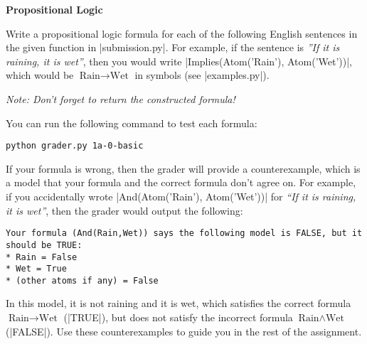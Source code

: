 \item {\bf Propositional Logic}

Write a propositional logic formula for each of the following English sentences
in the given function in |submission.py|. For example, if the sentence is
{\em ''If it is raining, it is wet''}, then you would write
|Implies(Atom('Rain'), Atom('Wet'))|, which would be $\text{Rain} \to
\text{Wet}$ in symbols (see |examples.py|).

{\em Note: Don't forget to return the constructed formula!}

\begin{enumerate}

  

  

  

\end{enumerate}

You can run the following command to test each formula:
\begin{lstlisting}
python grader.py 1a-0-basic
\end{lstlisting}

If your formula is wrong, then the grader will provide a counterexample, which
is a model that your formula and the correct formula don't agree on. For
example, if you accidentally wrote |And(Atom('Rain'), Atom('Wet'))| for
{\em ``If it is raining, it is wet''}, then the grader would output the
following:
\begin{lstlisting}
Your formula (And(Rain,Wet)) says the following model is FALSE, but it should be TRUE:
* Rain = False
* Wet = True
* (other atoms if any) = False
\end{lstlisting}

In this model, it is not raining and it is wet, which satisfies the correct
formula $\text{Rain} \to \text{Wet}$ (|TRUE|), but does not satisfy the
incorrect formula $\text{Rain} \wedge \text{Wet}$ (|FALSE|). Use these
counterexamples to guide you in the rest of the assignment.
